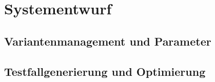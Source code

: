 \chapter{Systementwurf}\label{chp:systementwurf}


\section{Variantenmanagement und Parameter}
\paragraph{}


\newpage
\section{Testfallgenerierung und Optimierung}
\paragraph{}
